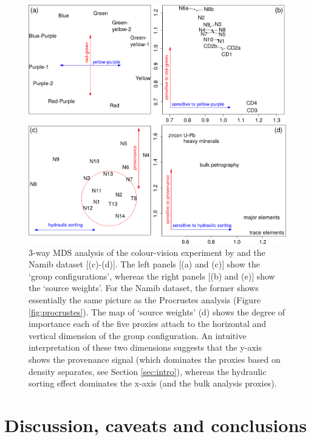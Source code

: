 \documentclass{article}
\begin{document}
\begin{figure}[!ht]
\centering
\includegraphics[width=\textwidth]{3-way3.png}
\caption{3-way MDS analysis of the colour-vision experiment by
  \citet[][(a)-(b)]{helm1964} and the Namib dataset [(c)-(d)].  The
  left panels [(a) and (c)] show the `group configurations', whereas
  the right panels [(b) and (e)] show the `source weights'.  For the
  Namib dataset, the former shows essentially the same picture as the
  Procrustes analysis (Figure \ref{fig:procrustes}). The map of
  `source weights' (d) shows the degree of importance each of the five
  proxies attach to the horizontal and vertical dimension of the group
  configuration. An intuitive interpretation of these two dimensions
  suggests that the y-axis shows the provenance signal (which
  dominates the proxies based on density separates, see Section
  \ref{sec:intro}), whereas the hydraulic sorting effect dominates the
  x-axis (and the bulk analysis proxies).}
\label{fig:3-way}
\end{figure}

\section{Discussion, caveats and conclusions}
\label{sec:discussion}
\end{document}
